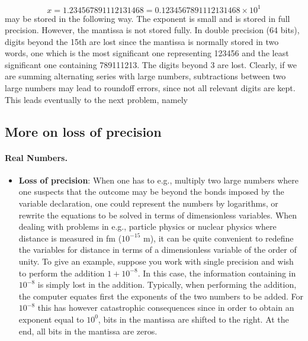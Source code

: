 \documentclass[%
oneside,                 %
final,                   %
10pt]{article}
\begin{document}
{{{{{\begin{equation}
   x= 1.234567891112131468 = 0.1234567891112131468\times 10^{1}
\end{equation}
may be stored in the following way. The exponent is  small
and is stored in full precision. However,
the mantissa is not stored fully. In double precision (64 bits), digits
beyond the
15th are lost since the mantissa is normally stored in two words,
one which is the most significant one representing
123456 and the least significant one containing 789111213. The digits
beyond 3 are lost. Clearly, if we are summing alternating series
with large numbers, subtractions between two large numbers may lead
to roundoff errors, since not all relevant digits are kept.
This leads eventually to the next problem, namely

\subsection{More on loss of precision}


\paragraph{Real Numbers.}

\begin{itemize}
  \item \textbf{Loss of precision}: When one has to e.g., multiply two large numbers where one suspects that the outcome may be beyond the bonds imposed by the variable declaration, one could represent the numbers by logarithms, or rewrite the equations to be solved in terms of dimensionless variables. When dealing with problems in e.g., particle physics or nuclear physics where distance is measured in fm ($10^{-15}$ m), it can be quite convenient to redefine the variables for distance in terms of a dimensionless variable of the order of unity. To give an example, suppose you work with single precision and wish to perform the addition $1+10^{-8}$. In this case, the information containing in $10^{-8}$ is simply lost in the addition. Typically, when performing the addition, the computer equates first the exponents of the two numbers to be added. For $10^{-8}$ this has however catastrophic consequences since in order to obtain an exponent equal to $10^0$, bits in the mantissa are shifted to the right. At the end, all bits in the mantissa are zeros.
\end{itemize}

\noindent



}}}}}
\end{document}
